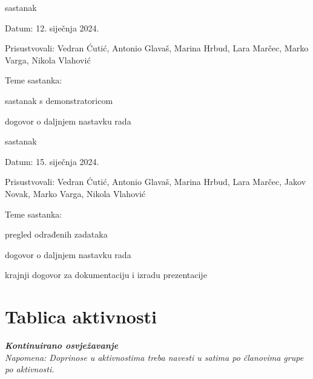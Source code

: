 \begin{packed_enum}
			\item  sastanak
			\item[] \begin{packed_item}
						\item Datum: 12. siječnja 2024.
						\item Prisustvovali: Vedran Ćutić, Antonio Glavaš, Marina Hrbud, Lara Marčec, Marko Varga, Nikola Vlahović
						\item Teme sastanka:
						\begin{packed_item}
							\item  sastanak s demonstratoricom
							\item  dogovor o daljnjem nastavku rada
						\end{packed_item}
			\end{packed_item}

			\item  sastanak
			\item[] \begin{packed_item}
						\item Datum: 15. siječnja 2024.
						\item Prisustvovali: Vedran Ćutić, Antonio Glavaš, Marina Hrbud, Lara Marčec, Jakov Novak, Marko Varga, Nikola Vlahović
						\item Teme sastanka:
						\begin{packed_item}
							\item  pregled odrađenih zadataka
							\item  dogovor o daljnjem nastavku rada
							\item  krajnji dogovor za dokumentaciju i izradu prezentacije
						\end{packed_item}
			\end{packed_item}
			
			
		\end{packed_enum}
		
		\eject
		\section*{Tablica aktivnosti}
		
			\textbf{\textit{Kontinuirano osvježavanje}}\\
			
			 \textit{Napomena: Doprinose u aktivnostima treba navesti u satima po članovima grupe po aktivnosti.}

